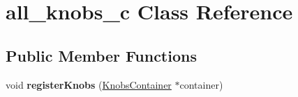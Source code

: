 \hypertarget{classall__knobs__c}{
\section{all\_\-knobs\_\-c Class Reference}
\label{classall__knobs__c}
}
\subsection*{Public Member Functions}
\begin{DoxyCompactItemize}
\item 
\hypertarget{classall__knobs__c_a770303b36194353497af9ddc8ef2706f}{
void {\bfseries registerKnobs} (\hyperlink{classKnobsContainer}{KnobsContainer} $\ast$container)}
\label{classall__knobs__c_a770303b36194353497af9ddc8ef2706f}

\end{DoxyCompactItemize}
